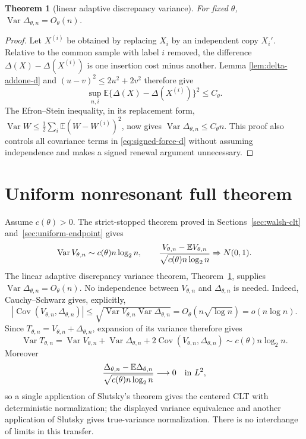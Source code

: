 \documentclass[11pt]{article}
\numberwithin{equation}{section}
\newtheorem{theorem}{Theorem}[section]
\newcommand{\1}{\mathbf 1}\newcommand{\F}{\mathcal F}\newcommand{\D}{\mathcal D}
\begin{document}
\begin{theorem}[linear adaptive discrepancy variance]\label{thm:delta-linear-d}
For fixed $\theta$, $\operatorname{Var}\Delta_{\theta,n}=O_\theta(n)$.
\end{theorem}
\begin{proof}
Let $X^{(i)}$ be obtained by replacing $X_i$ by an independent copy $X_i'$.
Relative to the common sample with label $i$ removed, the difference
$\Delta(X)-\Delta(X^{(i)})$ is one insertion cost minus another.  Lemma
\ref{lem:delta-addone-d} and $(u-v)^2\le2u^2+2v^2$ therefore give
\[
 \sup_{n,i}\mathbb E\{\Delta(X)-\Delta(X^{(i)})\}^2\le C_\theta.
\]
The Efron--Stein inequality, in its replacement form,
$\operatorname{Var}W\le\frac12\sum_i\mathbb E(W-W^{(i)})^2$, now gives
$\operatorname{Var}\Delta_{\theta,n}\le C_\theta n$.
This proof also controls all covariance terms in \eqref{eq:signed-force-d}
without assuming independence and makes a signed renewal argument unnecessary.
\end{proof}

\section{Uniform nonresonant full theorem}
Assume $c(\theta)>0$.  The strict-stopped theorem proved in
Sections~\ref{sec:walsh-clt} and~\ref{sec:uniform-endpoint} gives
\[
 \operatorname{Var}V_{\theta,n}\sim c(\theta)n\log_2n,
 \qquad
 {V_{\theta,n}-\mathbb EV_{\theta,n}\over
  \sqrt{c(\theta)n\log_2n}}\Rightarrow N(0,1).
\]
The linear adaptive discrepancy variance theorem,
Theorem~\ref{thm:delta-linear-d}, supplies
$\operatorname{Var}\Delta_{\theta,n}=O_\theta(n)$.  No independence
between $V_{\theta,n}$ and $\Delta_{\theta,n}$ is needed.  Indeed,
Cauchy--Schwarz gives, explicitly,
\[
 |\operatorname{Cov}(V_{\theta,n},\Delta_{\theta,n})|
 \le \sqrt{\operatorname{Var}V_{\theta,n}
                  \operatorname{Var}\Delta_{\theta,n}}
 =O_\theta(n\sqrt{\log n})=o(n\log n).
\]
Since $T_{\theta,n}=V_{\theta,n}+\Delta_{\theta,n}$, expansion of its
variance therefore gives
\[
 \operatorname{Var}T_{\theta,n}
 =\operatorname{Var}V_{\theta,n}+\operatorname{Var}\Delta_{\theta,n}
   +2\operatorname{Cov}(V_{\theta,n},\Delta_{\theta,n})
 \sim c(\theta)n\log_2n.
\]
Moreover
\[
 {\Delta_{\theta,n}-\mathbb E\Delta_{\theta,n}\over
       \sqrt{c(\theta)n\log_2n}}\longrightarrow0
 \quad\hbox{in }L^2,
\]
so a single application of Slutsky's theorem gives the centered CLT
with deterministic normalization; the displayed variance equivalence and
another application of Slutsky gives true-variance normalization.
There is no interchange of limits in this transfer.
\end{document}
